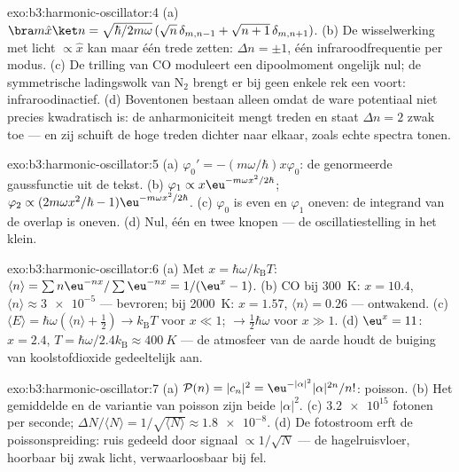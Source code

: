\begin{solution}{exo:b3:harmonic-oscillator:4}
(a) $\bra m\hat x\ket n = \sqrt{\hbar/2m\omega}\,(\sqrt n\,
\delta_{m,n-1} + \sqrt{n + 1}\,\delta_{m,n+1})$. (b) De wisselwerking
met licht $\propto\hat x$ kan maar één trede zetten: $\Delta n =
\pm1$,
één infraroodfrequentie per modus. (c) De trilling van CO moduleert een
dipoolmoment ongelijk nul; de symmetrische ladingswolk van N$_2$ brengt er
bij geen enkele rek een voort: infraroodinactief. (d) Boventonen bestaan
alleen omdat de ware potentiaal niet precies kwadratisch is: de
anharmoniciteit mengt treden en staat $\Delta n = 2$ zwak toe --- en zij
schuift de hoge treden dichter naar elkaar, zoals echte spectra tonen.
\end{solution}

\begin{solution}{exo:b3:harmonic-oscillator:5}
(a) $\varphi_0' = -(m\omega/\hbar)x\varphi_0$: de genormeerde
gaussfunctie uit de tekst. (b) $\varphi_1 \propto x\eu^{-m\omega
x^2/2\hbar}$; $\varphi_2 \propto (2m\omega x^2/\hbar -
1)\eu^{-m\omega x^2/2\hbar}$. (c) $\varphi_0$ is even en $\varphi_1$
oneven: de integrand van de overlap is oneven. (d) Nul, één en twee
knopen --- de oscillatiestelling in het klein.
\end{solution}

\begin{solution}{exo:b3:harmonic-oscillator:6}
(a) Met $x = \hbar\omega/k_{\text{B}}T$: $\langle n\rangle =
\sum n\eu^{-nx}/\sum\eu^{-nx} = 1/(\eu^x - 1)$. (b) CO bij
\qty{300}{K}: $x = 10.4$, $\langle n\rangle \approx \num{3e-5}$ ---
bevroren; bij \qty{2000}{K}: $x = 1.57$, $\langle n\rangle = 0.26$ ---
ontwakend. (c) $\langle E\rangle = \hbar\omega(\langle n\rangle +
\tfrac12) \to k_{\text{B}}T$ voor $x \ll 1$; $\to \tfrac12\hbar
\omega$ voor $x \gg 1$. (d) $\eu^x = 11$: $x = 2.4$, $T =
\hbar\omega/2.4k_{\text{B}} \approx \qty{400}{K}$ --- de atmosfeer van de
aarde houdt de buiging van koolstofdioxide gedeeltelijk aan.
\end{solution}

\begin{solution}{exo:b3:harmonic-oscillator:7}
(a) $\mathcal P(n) = |c_n|^2 = \eu^{-|\alpha|^2}|\alpha|^{2n}/n!$:
poisson. (b) Het gemiddelde en de variantie van poisson zijn beide
$|\alpha|^2$. (c) $\num{3.2e15}$ fotonen per seconde; $\Delta N/\langle N\rangle =
1/\sqrt{\langle N\rangle} \approx \num{1.8e-8}$. (d) De
fotostroom erft de poissonspreiding: ruis gedeeld door signaal
$\propto 1/\sqrt N$ --- de hagelruisvloer, hoorbaar bij zwak licht,
verwaarloosbaar bij fel.
\end{solution}

